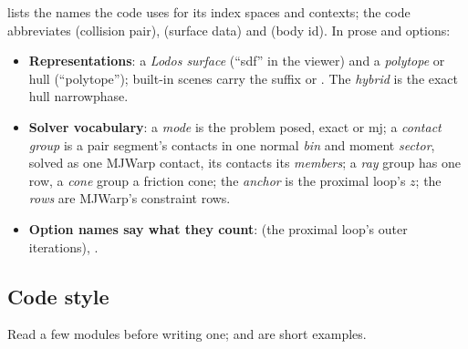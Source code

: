  lists the names the code uses for its index spaces and contexts; the code abbreviates  (collision pair),  (surface data) and  (body id). In prose and options:

\begin{itemize}
\item \textbf{Representations}: a \emph{Lodos surface} (``sdf'' in the viewer) and a \emph{polytope} or hull (``polytope''); built-in scenes carry the suffix  or . The \emph{hybrid} is the exact hull narrowphase.
\item \textbf{Solver vocabulary}: a \emph{mode} is the problem posed, exact or mj; a \emph{contact group} is a pair segment's contacts in one normal \emph{bin} and moment \emph{sector}, solved as one MJWarp contact, its contacts its \emph{members}; a \emph{ray} group has one row, a \emph{cone} group a friction cone; the \emph{anchor} is the proximal loop's $z$; the \emph{rows} are MJWarp's constraint rows.
\item \textbf{Option names say what they count}:  (the proximal loop's outer iterations), .
\end{itemize}

\subsection{Code style}\label{sec:style}

Read a few modules before writing one;  and  are short examples.


